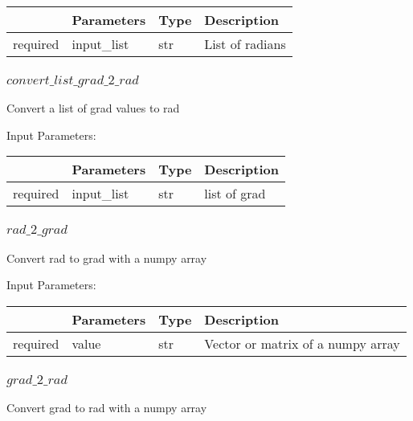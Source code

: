 \documentclass[
	ngerman,
	accentcolor=9c,%
	type=intern,
	marginpar=false
	]{tudapub}
\begin{document}
\begin{tabular}{|p{}|p{}|p{}| p{}|}
\hline
 & \textbf{Parameters} & \textbf{Type} & \textbf{Description} \\
\hline
required & input\_list & str &  List of radians \\
\hline
\end{tabular}
\vspace{1cm}


\subsubsection{$convert\_list\_grad\_2\_rad$}
\noindent Convert a list of grad values to rad

\vspace{0.5cm}
\noindent Input Parameters:
\vspace{0.5cm}

\begin{tabular}{|p{}|p{}|p{}| p{}|}
\hline
 & \textbf{Parameters} & \textbf{Type} & \textbf{Description} \\
\hline
required & input\_list & str & list of grad \\
\hline
\end{tabular}
\vspace{1cm}


\subsubsection{$rad\_2\_grad$}
\noindent Convert rad to grad with a numpy array

\vspace{0.5cm}
\noindent Input Parameters:
\vspace{0.5cm}

\begin{tabular}{|p{}|p{}|p{}| p{}|}
\hline
 & \textbf{Parameters} & \textbf{Type} & \textbf{Description} \\
\hline
required & value & str & Vector or matrix of a numpy array \\
\hline
\end{tabular}
\vspace{1cm}

\subsubsection{$grad\_2\_rad$}
\noindent Convert grad to rad with a numpy array
\end{document}
